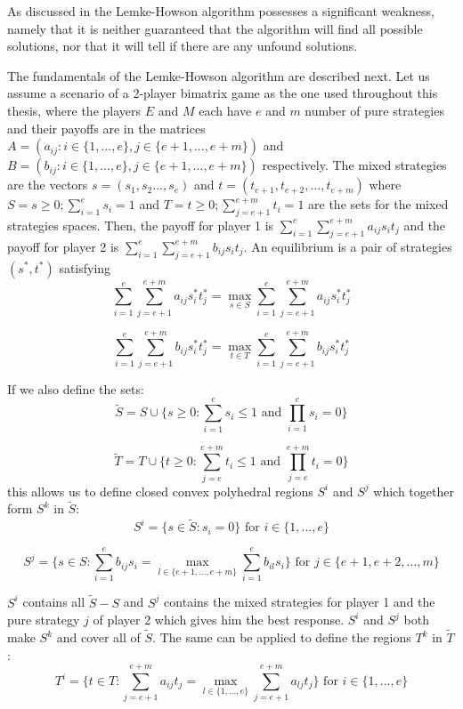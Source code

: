 As discussed in \citep{shapley1974note} the Lemke-Howson algorithm possesses a significant weakness, namely that it is neither guaranteed that the algorithm will find all possible solutions, nor that it will tell if there are any unfound solutions.

The fundamentals of the Lemke-Howson algorithm are described next. Let us assume a scenario of a 2-player bimatrix game as the one used throughout this thesis, where the players $E$ and $M$ each have $e$ and $m$ number of pure strategies and their payoffs are in the matrices $A = (a_{ij}: i \in \{1,...,e\}, j \in \{ e+1,...,e+m\})$ and $B = (b_{ij}: i \in \{1,...,e\}, j \in \{e+1,...,e+m\})$ respectively. The mixed strategies are the vectors $s=(s_1,s_2...,s_e)$ and $t=(t_{e+1},t_{e+2},...,t_{e+m})$ where $S = {s \geq 0; \sum_{i=1}^{e}s_i = 1}$ and $T = {t \geq 0; \sum_{j=e+1}^{e+m}t_i = 1}$ are the sets for the mixed strategies spaces. Then, the payoff for player 1 is $\sum_{i=1}^{e}\sum_{j=e+1}^{e+m} a_{ij} s_i t_j$ and the payoff for player 2 is $\sum_{i=1}^{e} \sum_{j=e+1}^{e+m} b_{ij} s_i t_j$. An equilibrium is a pair of strategies $(s^*,t^*)$ satisfying
\[
\sum_{i=1}^{e} \sum_{j=e+1}^{e+m} a_{ij}s_i^*t_j^* = \max_{s \in S} \sum_{i=1}^{e} \sum_{j=e+1}^{e+m} a_{ij}s_i^* t_j^*
\]

\[
\sum_{i=1}^{e} \sum_{j=e+1}^{e+m} b_{ij}s_i^*t_j^* = \max_{t \in T} \sum_{i=1}^{e} \sum_{j=e+1}^{e+m} b_{ij}s_i^* t_j^*
\]

If we also define the sets:
\[
\tilde{S} =  S \cup \{ s \geq 0: \sum_{i=1}^{e} s_i \leq 1 \text{ and } \prod_{i=1}^{e} s_i = 0 \}
\]

\[
\tilde{T} = T \cup \{t \geq 0: \sum_{j=e}^{e+m} t_i \leq 1 \text{ and } \prod_{j=e}^{e+m} t_i = 0 \}
\]
this allows us to define closed convex polyhedral regions $S^i$ and $S^j$ which together form $S^k$ in $\tilde{S}$:
\[
S^i = \{ s \in \tilde{S}: s_i = 0 \} \text{ for } i \in \{1,...,e\}
\]

\[
S^j = \{ s \in S: \sum_{i=1}^{e} b_{ij} s_i = \max_{l \in \{e+1,...,e+m\}} \sum_{i=1}^{e} b_{il} s_i \} \text{ for } j \in \{e+1,e+2,...,m\}
\]

$S^i$ contains all $\tilde{S}-S$ and $S^j$ contains the mixed strategies for player 1 and the pure strategy $j$ of player 2 which gives him the best response. $S^i$ and $S^j$ both make $S^k$ and cover all of $\tilde{S}$. The same can be applied to define the regions $T^k$ in $\tilde{T}$:
\[ 
T^i = \{ t \in T: \sum_{j=e+1}^{e+m} a_{ij} t_j = \max_{l \in \{1,...,e\}} \sum_{j=e+1}^{e+m} a_{lj} t_j \} \text{ for } i \in \{1,...,e\} 
\]

